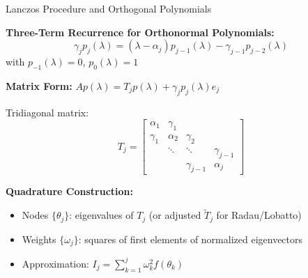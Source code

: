 \documentclass[aspectratio=169, 12pt]{beamer}
\begin{document}
\begin{frame}{Lanczos Procedure and Orthogonal Polynomials}

\textbf{Three-Term Recurrence for Orthonormal Polynomials:}
\[
\gamma_j p_j(\lambda) = (\lambda - \alpha_j) p_{j-1}(\lambda) - \gamma_{j-1} p_{j-2}(\lambda)
\]
with \(p_{-1}(\lambda) = 0\), \(p_0(\lambda) = 1\)

\vspace{0.3cm}

\textbf{Matrix Form:} \(A p(\lambda) = T_j p(\lambda) + \gamma_j p_j(\lambda) e_j\)

Tridiagonal matrix:
\[
T_j = 
\begin{bmatrix}
\alpha_1 & \gamma_1 & & \\
\gamma_1 & \alpha_2 & \gamma_2 & \\
& \ddots & \ddots & \gamma_{j-1} \\
& & \gamma_{j-1} & \alpha_j
\end{bmatrix}
\]

\vspace{0.3cm}

\textbf{Quadrature Construction:}
\begin{itemize}
    \item Nodes \(\{\theta_j\}\): eigenvalues of \(T_j\) (or adjusted \(\tilde{T}_j\) for Radau/Lobatto)
    \item Weights \(\{\omega_j\}\): squares of first elements of normalized eigenvectors
    \item Approximation: \(I_j = \sum_{k=1}^j \omega_k^2 f(\theta_k)\)
\end{itemize}

\end{frame}
\end{document}
